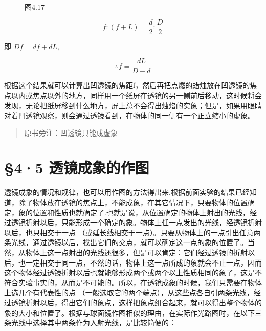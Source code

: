 \begin{figure}
\centering
\caption{图4.17}
\end{figure}

\[
f: (f + L) = \frac {d}{2}: \frac {D}{2}
\]

即 \(Df = df + dL,\)

\[
\therefore f = \frac {d L}{D - d}
\]

根据这个结果就可以计算出凹透镜的焦距f，然后再把点燃的蜡烛放在凹透镜的焦点以内或焦点以外的地方，同样用一个纸屏在透镜的另一侧前后移动，这时候将会发现，无论把纸屏移到什么地方，屏上总不会得出烛焰的实象；但是，如果用眼睛对着凹透镜观察，则会通过透镜看到，在物体的同一侧有一个正立缩小的虚象。

\begin{quote}
原书旁注：凹透镜只能成虚象
\end{quote}

\section{§4·5
透镜成象的作图}

透镜成象的情况和规律，也可以用作图的方法得出来.根据前面实验的结果已经知道，除了物体放在透镜的焦点上，不能成象，在其它情况下，只要物体的位置确定，象的位置和性质也就确定了.也就是说，从位置确定的物体上射出的光线，经过透镜折射以后，只能形成一个确定的象。物体上任一点发出的光线，经透镜折射以后，也只相交于一点
（或延长线相交于一点）。只要从物体上的一点引出任意两条光线，通过透镜以后，找出它们的交点，就可以确定这一点的象的位置了。当然，从物体上这一点射出的光线还很多，但是可以肯定：它们经过透镜的折射以后，也一定相交于同一点，不然的话，物体上这一点所成的象就会不止一点，因而这个物体经过透镜折射以后也就能够形成两个或两个以上性质相同的象了，这是不符合实验事实的，从而是不可能的。所以，在透镜成象的时候，我们只需要在物体上选几个有代表性的点
（一般选取它的两个端点），从这些点各自引两条光线，经过透镜折射以后，得出它们的象点，这样把象点组合起来，就可以得出整个物体的象的大小和位置了。根据与球面镜作图相似的理由，在实际作光路图时，在以下三条光线中选择其中两条作为入射光线，是比较简便的：

